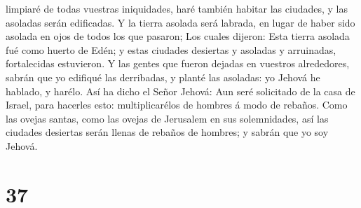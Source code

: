 limpiaré de todas vuestras iniquidades, haré también habitar las
ciudades, y las asoladas serán edificadas.  Y la tierra
asolada será labrada, en lugar de haber sido asolada en ojos de todos
los que pasaron;  Los cuales dijeron: Esta tierra asolada
fué como huerto de Edén; y estas ciudades desiertas y asoladas y
arruinadas, fortalecidas estuvieron.  Y las gentes que
fueron dejadas en vuestros alrededores, sabrán que yo edifiqué las
derribadas, y planté las asoladas: yo Jehová he hablado, y harélo.
 Así ha dicho el Señor Jehová: Aun seré solicitado de la
casa de Israel, para hacerles esto: multiplicarélos de hombres á modo de
rebaños.  Como las ovejas santas, como las ovejas de
Jerusalem en sus solemnidades, así las ciudades desiertas serán llenas
de rebaños de hombres; y sabrán que yo soy Jehová.

\hypertarget{section-36}{%
\section{37}\label{section-36}}

